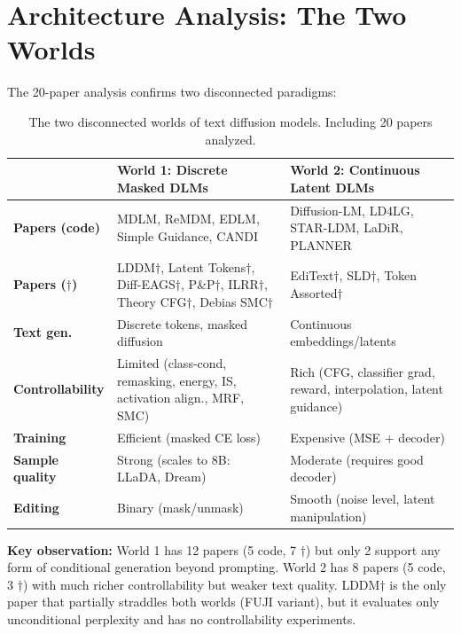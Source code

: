 \documentclass{article}
\begin{document}
\section{Architecture Analysis: The Two Worlds}

The 20-paper analysis confirms two disconnected paradigms:

\begin{table}[h]
\centering
\small
\begin{tabular}{@{}p{3cm}p{5.5cm}p{5.5cm}@{}}
\toprule
& \textbf{World 1: Discrete Masked DLMs} & \textbf{World 2: Continuous Latent DLMs} \\
\midrule
\textbf{Papers (code)} & MDLM, ReMDM, EDLM, Simple Guidance, CANDI & Diffusion-LM, LD4LG, STAR-LDM, LaDiR, PLANNER \\
\textbf{Papers ($\dagger$)} & LDDM$\dagger$, Latent Tokens$\dagger$, Diff-EAGS$\dagger$, P\&P$\dagger$, ILRR$\dagger$, Theory CFG$\dagger$, Debias SMC$\dagger$ & EdiText$\dagger$, SLD$\dagger$, Token Assorted$\dagger$ \\
\textbf{Text gen.} & Discrete tokens, masked diffusion & Continuous embeddings/latents \\
\textbf{Controllability} & Limited (class-cond, remasking, energy, IS, activation align., MRF, SMC) & Rich (CFG, classifier grad, reward, interpolation, latent guidance) \\
\textbf{Training} & Efficient (masked CE loss) & Expensive (MSE + decoder) \\
\textbf{Sample quality} & Strong (scales to 8B: LLaDA, Dream) & Moderate (requires good decoder) \\
\textbf{Editing} & Binary (mask/unmask) & Smooth (noise level, latent manipulation) \\
\bottomrule
\end{tabular}
\caption{The two disconnected worlds of text diffusion models. Including 20 papers analyzed.}
\end{table}

\textbf{Key observation:} World 1 has 12 papers (5 code, 7 $\dagger$) but only 2 support any form of conditional generation beyond prompting. World 2 has 8 papers (5 code, 3 $\dagger$) with much richer controllability but weaker text quality. LDDM$\dagger$ is the only paper that partially straddles both worlds (FUJI variant), but it evaluates only unconditional perplexity and has no controllability experiments.
\end{document}
